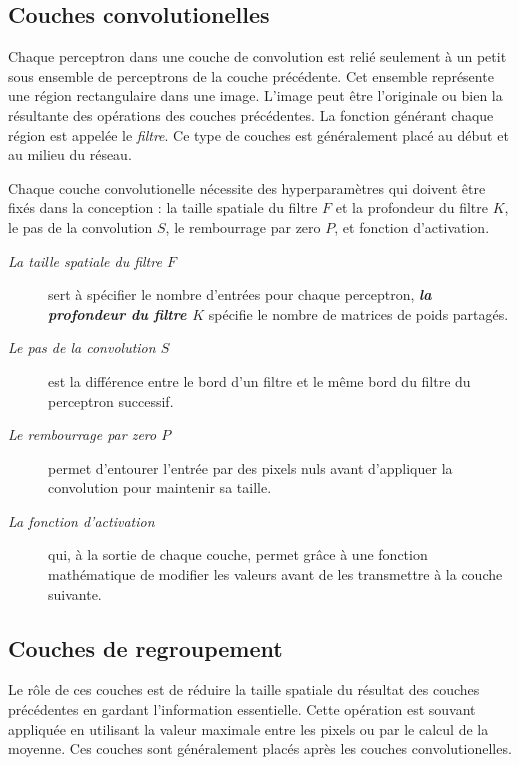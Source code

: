 \subsection{Couches convolutionelles}

Chaque perceptron dans une couche de convolution est relié seulement à un petit
sous ensemble de perceptrons de la couche précédente. Cet ensemble représente
une région rectangulaire dans une image. L'image peut être l'originale ou
bien la résultante des opérations des couches précédentes. La fonction générant
chaque région est appelée le \emph{filtre}. Ce type de couches est généralement
placé au début et au milieu du réseau.

Chaque couche convolutionelle nécessite des hyperparamètres qui doivent
être fixés dans la conception : la taille spatiale du filtre $F$ et la
profondeur du filtre $K$, le pas de la convolution $S$, le rembourrage par zero
$P$, et fonction d'activation.

\begin{description}
  \item[\emph{La taille spatiale du filtre $F$}] sert à
  spécifier le nombre d'entrées pour chaque perceptron,
  \emph{\textbf{la profondeur du filtre $K$}} spécifie
  le nombre de matrices de poids partagés.
  \item[\emph{Le pas de la convolution $S$}] est la différence entre le bord d'un
  filtre et le même bord du filtre du perceptron successif.
  \item[\emph{Le rembourrage par zero $P$}] permet d'entourer
  l'entrée par des pixels nuls avant d'appliquer la convolution pour maintenir
  sa taille.
  \item[\emph{La fonction d'activation}] qui, à la sortie de chaque couche, permet grâce
  à une fonction mathématique de modifier les valeurs avant de les transmettre à la
  couche suivante.
\end{description}

\subsection{Couches de regroupement}

Le rôle de ces couches est de réduire la taille spatiale du résultat des couches
précédentes en gardant l'information essentielle. Cette opération est souvant
appliquée en utilisant la valeur maximale entre les pixels ou par le calcul de
la moyenne. Ces couches sont généralement placés après les couches
convolutionelles.

